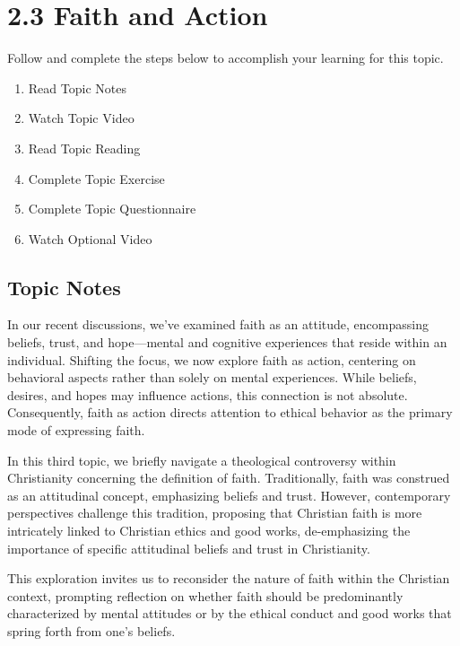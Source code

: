 \documentclass[
]{book}
\providecommand{\tightlist}{%
  \setlength{\itemsep}{0pt}\setlength{\parskip}{0pt}}
\begin{document}
\hypertarget{faith-and-action}{%
\section*{2.3 Faith and Action}\label{faith-and-action}}

Follow and complete the steps below to accomplish your learning for this topic.

\begin{enumerate}
\def\labelenumi{\arabic{enumi}.}
\tightlist
\item
  Read Topic Notes
\item
  Watch Topic Video
\item
  Read Topic Reading
\item
  Complete Topic Exercise
\item
  Complete Topic Questionnaire
\item
  Watch Optional Video
\end{enumerate}

\hypertarget{topic-notes-6}{%
\subsection*{Topic Notes}\label{topic-notes-6}}

In our recent discussions, we've examined faith as an attitude, encompassing beliefs, trust, and hope---mental and cognitive experiences that reside within an individual. Shifting the focus, we now explore faith as action, centering on behavioral aspects rather than solely on mental experiences. While beliefs, desires, and hopes may influence actions, this connection is not absolute. Consequently, faith as action directs attention to ethical behavior as the primary mode of expressing faith.

In this third topic, we briefly navigate a theological controversy within Christianity concerning the definition of faith. Traditionally, faith was construed as an attitudinal concept, emphasizing beliefs and trust. However, contemporary perspectives challenge this tradition, proposing that Christian faith is more intricately linked to Christian ethics and good works, de-emphasizing the importance of specific attitudinal beliefs and trust in Christianity.

This exploration invites us to reconsider the nature of faith within the Christian context, prompting reflection on whether faith should be predominantly characterized by mental attitudes or by the ethical conduct and good works that spring forth from one's beliefs.
\end{document}
